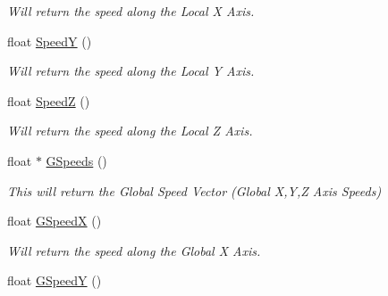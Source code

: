 \begin{DoxyCompactItemize}
\begin{DoxyCompactList}\small\item\em Will return the speed along the Local X Axis. \end{DoxyCompactList}\item 
\hypertarget{classc_momentum_a649b177cb629fce975641e69ac9df2ab}{
float \hyperlink{classc_momentum_a649b177cb629fce975641e69ac9df2ab}{SpeedY} ()}
\label{classc_momentum_a649b177cb629fce975641e69ac9df2ab}

\begin{DoxyCompactList}\small\item\em Will return the speed along the Local Y Axis. \end{DoxyCompactList}\item 
\hypertarget{classc_momentum_ab107d0a5bb3c2c935410830009455b3c}{
float \hyperlink{classc_momentum_ab107d0a5bb3c2c935410830009455b3c}{SpeedZ} ()}
\label{classc_momentum_ab107d0a5bb3c2c935410830009455b3c}

\begin{DoxyCompactList}\small\item\em Will return the speed along the Local Z Axis. \end{DoxyCompactList}\item 
\hypertarget{classc_momentum_a1afdf316daeacb768ae986e4893b45e0}{
float $\ast$ \hyperlink{classc_momentum_a1afdf316daeacb768ae986e4893b45e0}{GSpeeds} ()}
\label{classc_momentum_a1afdf316daeacb768ae986e4893b45e0}

\begin{DoxyCompactList}\small\item\em This will return the Global Speed Vector (Global X,Y,Z Axis Speeds) \end{DoxyCompactList}\item 
\hypertarget{classc_momentum_acaad0c9e2d375a82b2cffe8ca8056acc}{
float \hyperlink{classc_momentum_acaad0c9e2d375a82b2cffe8ca8056acc}{GSpeedX} ()}
\label{classc_momentum_acaad0c9e2d375a82b2cffe8ca8056acc}

\begin{DoxyCompactList}\small\item\em Will return the speed along the Global X Axis. \end{DoxyCompactList}\item 
\hypertarget{classc_momentum_a614d9e117518e4cbcbb1caa8b2b68ccd}{
float \hyperlink{classc_momentum_a614d9e117518e4cbcbb1caa8b2b68ccd}{GSpeedY} ()}
\label{classc_momentum_a614d9e117518e4cbcbb1caa8b2b68ccd}


\end{DoxyCompactItemize}

